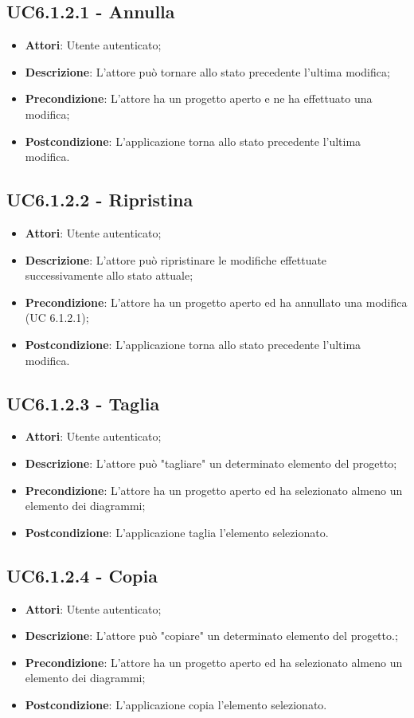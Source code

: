 \subsection{UC6.1.2.1 - Annulla} 
\label{ssec:UC6.1.2.1} 
\begin{itemize} 
\item \textbf{Attori}: Utente autenticato;
\item \textbf{Descrizione}: L’attore può tornare allo stato precedente l’ultima modifica;
\item \textbf{Precondizione}: L'attore ha un progetto aperto e ne ha effettuato una modifica;
\item \textbf{Postcondizione}: L’applicazione torna allo stato precedente l’ultima modifica.
\end{itemize} 
\subsection{UC6.1.2.2 - Ripristina} 
\label{ssec:UC6.1.2.2} 
\begin{itemize} 
\item \textbf{Attori}: Utente autenticato;
\item \textbf{Descrizione}: L’attore può ripristinare le modifiche effettuate successivamente allo stato attuale;
\item \textbf{Precondizione}: L’attore ha un progetto aperto ed ha annullato una modifica (UC 6.1.2.1);
\item \textbf{Postcondizione}: L’applicazione torna allo stato precedente l’ultima modifica.
\end{itemize} 
\subsection{UC6.1.2.3 - Taglia} 
\label{ssec:UC6.1.2.3} 
\begin{itemize} 
\item \textbf{Attori}: Utente autenticato;
\item \textbf{Descrizione}: L’attore può "tagliare" un determinato elemento del progetto;
\item \textbf{Precondizione}: L’attore ha un progetto aperto ed ha selezionato almeno un elemento dei diagrammi;
\item \textbf{Postcondizione}: L’applicazione taglia l’elemento selezionato.
\end{itemize} 
\subsection{UC6.1.2.4 - Copia} 
\label{ssec:UC6.1.2.4} 
\begin{itemize} 
\item \textbf{Attori}: Utente autenticato;
\item \textbf{Descrizione}: L’attore può "copiare" un determinato elemento del progetto.;
\item \textbf{Precondizione}: L’attore ha un progetto aperto ed ha selezionato almeno un elemento dei diagrammi;
\item \textbf{Postcondizione}: L’applicazione copia l’elemento selezionato.
\end{itemize} 
